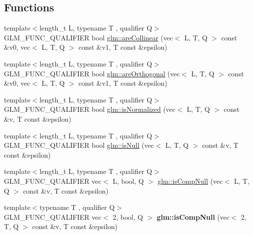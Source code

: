 \subsection*{Functions}
\begin{DoxyCompactItemize}
\item 
{\footnotesize template$<$length\+\_\+t L, typename T , qualifier Q$>$ }\\G\+L\+M\+\_\+\+F\+U\+N\+C\+\_\+\+Q\+U\+A\+L\+I\+F\+I\+ER bool \hyperlink{group__gtx__vector__query_ga13da4a787a2ff70e95d561fb19ff91b4}{glm\+::are\+Collinear} (vec$<$ L, T, Q $>$ const \&v0, vec$<$ L, T, Q $>$ const \&v1, T const \&epsilon)
\item 
{\footnotesize template$<$length\+\_\+t L, typename T , qualifier Q$>$ }\\G\+L\+M\+\_\+\+F\+U\+N\+C\+\_\+\+Q\+U\+A\+L\+I\+F\+I\+ER bool \hyperlink{group__gtx__vector__query_gac7b95b3f798e3c293262b2bdaad47c57}{glm\+::are\+Orthogonal} (vec$<$ L, T, Q $>$ const \&v0, vec$<$ L, T, Q $>$ const \&v1, T const \&epsilon)
\item 
{\footnotesize template$<$length\+\_\+t L, typename T , qualifier Q$>$ }\\G\+L\+M\+\_\+\+F\+U\+N\+C\+\_\+\+Q\+U\+A\+L\+I\+F\+I\+ER bool \hyperlink{group__gtx__vector__query_gac3c974f459fd75453134fad7ae89a39e}{glm\+::is\+Normalized} (vec$<$ L, T, Q $>$ const \&v, T const \&epsilon)
\item 
{\footnotesize template$<$length\+\_\+t L, typename T , qualifier Q$>$ }\\G\+L\+M\+\_\+\+F\+U\+N\+C\+\_\+\+Q\+U\+A\+L\+I\+F\+I\+ER bool \hyperlink{group__gtx__vector__query_gab4a3637dbcb4bb42dc55caea7a1e0495}{glm\+::is\+Null} (vec$<$ L, T, Q $>$ const \&v, T const \&epsilon)
\item 
{\footnotesize template$<$length\+\_\+t L, typename T , qualifier Q$>$ }\\G\+L\+M\+\_\+\+F\+U\+N\+C\+\_\+\+Q\+U\+A\+L\+I\+F\+I\+ER vec$<$ L, bool, Q $>$ \hyperlink{group__gtx__vector__query_gaf6ec1688eab7442fe96fe4941d5d4e76}{glm\+::is\+Comp\+Null} (vec$<$ L, T, Q $>$ const \&v, T const \&epsilon)
\item 
\mbox{\label{vector__query_8inl_aa194d2ce350422b8c307778002a5429d}} 
{\footnotesize template$<$typename T , qualifier Q$>$ }\\G\+L\+M\+\_\+\+F\+U\+N\+C\+\_\+\+Q\+U\+A\+L\+I\+F\+I\+ER vec$<$ 2, bool, Q $>$ {\bfseries glm\+::is\+Comp\+Null} (vec$<$ 2, T, Q $>$ const \&v, T const \&epsilon)

\end{DoxyCompactItemize}

